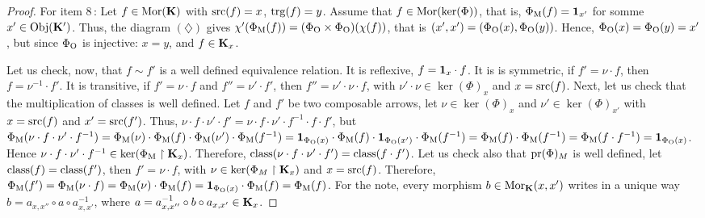 \begin{proof}
  For item 8\,:
  Let $f \in {\operatorname{Mor}}({\mathbf K})$ with ${\operatorname{src}}(f) = x$,
  ${\operatorname{trg}}(f) = y$.
  Assume that $f \in {\operatorname{Mor}}(\mathrm{ker}(\Phi))$,
  that is,
  $\Phi_{\mathrm{M}}(f) = {\bf 1}_{x'}$ for somme $x' \in {\operatorname{Obj}}({\mathbf K}')$.
  Thus,
  the diagram $(\diamondsuit)$ gives $\chi'(\Phi_{\mathrm{M}}(f)) = (\Phi_{\mathrm{O}} \times \Phi_{\mathrm{O}})(\chi(f))$,
  that is $(x',x') = (\Phi_{\mathrm{O}}(x),\Phi_{\mathrm{O}}(y))$.
  Hence,
  $\Phi_{\mathrm{O}}(x)=\Phi_{\mathrm{O}}(y)=x'$,
  but since $\Phi_{\mathrm{O}}$ is injective:
  $x = y$,
  and $f \in {\mathbf K}_x$.
  
  Let us check,
  now,
  that $f \sim f'$ is a well defined equivalence relation. It is
  reflexive, $f = {\bf 1}_x \cdot f$. It is is symmetric,
  if $f' = \nu \cdot f$, then $f = \nu^{-1} \cdot f'$. It is transitive,
  if $f' = \nu \cdot f$ and $f'' = \nu' \cdot f'$, then
  $f'' = \nu' \cdot \nu \cdot f$, with $\nu' \cdot \nu \in \ker(\Phi)_x$
  and $x = {\operatorname{src}}(f)$.
  Next, let us check that the multiplication of classes is well defined. Let $f$ and $f'$
  be two composable arrows, let $\nu \in \ker(\Phi)_x$ and $\nu' \in \ker(\Phi)_{x'}$
  with $x = {\operatorname{src}}(f)$ and $x' = {\operatorname{src}}(f')$. Thus,
  $\nu \cdot f \cdot \nu' \cdot f' = \nu \cdot f \cdot \nu' \cdot f^{-1} \cdot f \cdot f'$,
  but $\Phi_{\mathrm{M}}(\nu \cdot f \cdot \nu' \cdot f^{-1}) = \Phi_{\mathrm{M}}(\nu) \cdot  \Phi_{\mathrm{M}}(f) \cdot
  \Phi_{\mathrm{M}}(\nu') \cdot  \Phi_{\mathrm{M}}(f^{-1}) =
  {\bf 1}_{\Phi_{\mathrm{O}}(x)} \cdot \Phi_{\mathrm{M}}(f) \cdot {\bf 1}_{\Phi_{\mathrm{O}}(x')} \cdot \Phi_{\mathrm{M}}(f^{-1})
  = \Phi_{\mathrm{M}}(f) \cdot \Phi_{\mathrm{M}}(f^{-1}) = \Phi_{\mathrm{M}}(f \cdot f^{-1})
  = {\bf 1}_{\Phi_{\mathrm{O}}(x)}$. Hence $\nu \cdot f \cdot \nu' \cdot f^{-1} \in
  \mathrm{ker}(\Phi_{\mathrm{M}} \restriction {\mathbf K}_x)$. Therefore,
  $\operatorname{class}(\nu \cdot f \cdot \nu' \cdot f') = \operatorname{class}(f \cdot f')$.
  Let us check also that $\mathrm{pr}(\Phi)_M$ is well defined, let
  $\operatorname{class}(f) = \operatorname{class}(f')$, then $f' = \nu \cdot f$,
  with $\nu \in \mathrm{ker}(\Phi_M \restriction {\mathbf K}_x)$ and $x = {\operatorname{src}}(f)$. Therefore,
  $\Phi_{\mathrm{M}}(f') = \Phi_{\mathrm{M}}(\nu \cdot f) = \Phi_{\mathrm{M}}(\nu) \cdot \Phi_{\mathrm{M}}(f) =
  {\bf 1}_{\Phi_{\mathrm{O}}(x)} \cdot \Phi_{\mathrm{M}}(f) = \Phi_{\mathrm{M}}(f)$.
  For the note, every morphism
  $b \in {\operatorname{Mor}}_{\mathbf K}(x,x')$ writes in a unique way $b
  = a_{x,x''} \circ a \circ a_{x,x'}^{-1}$, where $a
  = a_{x,x''}^{-1} \circ b \circ a_{x,x'} \in {\mathbf K}_x$.
\end{proof}

